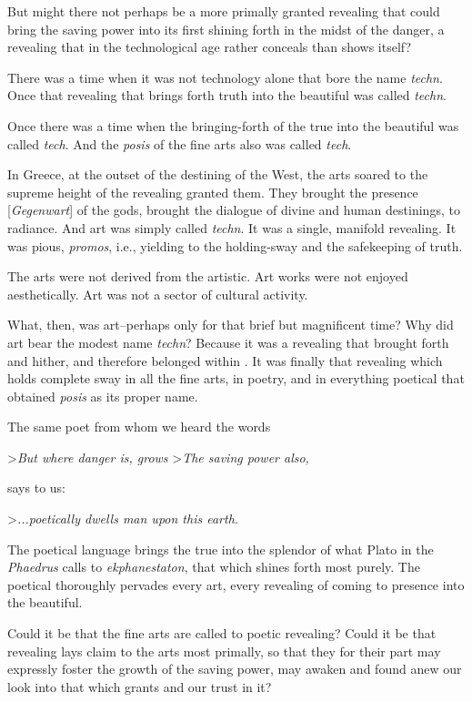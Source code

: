 But might there not perhaps be a more primally granted revealing that could bring the saving power into its first shining forth in the midst of the danger, a revealing that in the technological age rather conceals than shows itself?

There was a time when it was not technology alone that bore the name \textit{techn}. Once that revealing that brings forth truth into the beautiful was called \textit{techn}.

Once there was a time when the bringing-forth of the true into the beautiful was called \textit{tech}. And the \textit{posis} of the fine arts also was called \textit{tech}.

In Greece, at the outset of the destining of the West, the arts soared to the supreme height of the revealing granted them. They brought the presence [\textit{Gegenwart}] of the gods, brought the dialogue of divine and human destinings, to radiance. And art was simply called \textit{techn}. It was a single, manifold revealing. It was pious, \textit{promos}, i.e., yielding to the holding-sway and the safekeeping of truth.

The arts were not derived from the artistic. Art works were not enjoyed aesthetically. Art was not a sector of cultural activity.

What, then, was art--perhaps only for that brief but magnificent time? Why did art bear the modest name \textit{techn}? Because it was a revealing that brought forth and hither, and therefore belonged within . It was finally that revealing which holds complete sway in all the fine arts, in poetry, and in everything poetical that obtained \textit{posis} as its proper name.

The same poet from whom we heard the words

>\textit{But where danger is, grows}
>\textit{The saving power also,}

says to us:

>\textit{...poetically dwells man upon this earth.}

The poetical language brings the true into the splendor of what Plato in the \textit{Phaedrus} calls to \textit{ekphanestaton}, that which shines forth most purely. The poetical thoroughly pervades every art, every revealing of coming to presence into the beautiful.

Could it be that the fine arts are called to poetic revealing? Could it be that revealing lays claim to the arts most primally, so that they for their part may expressly foster the growth of the saving power, may awaken and found anew our look into that which grants and our trust in it?

